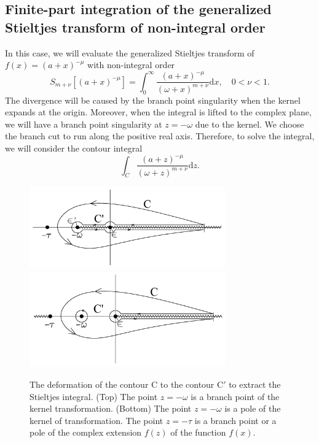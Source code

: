 \subsection{Finite-part integration of the generalized Stieltjes transform of non-integral order}
In this case, we will evaluate the generalized Stieltjes transform of $f(x) = (a+x)^{-\mu}$ with non-integral order
\begin{equation}
    S_{m+\nu}[(a+x)^{-\mu}] = \int_{0}^{\infty} \frac{(a+x)^{-\mu}}{(\omega+x)^{m+\nu}} \mathrm{d}x, \quad 0<\nu<1.
\end{equation}
The divergence will be caused by the branch point singularity when the kernel expands at the origin. Moreover, when the integral is lifted to the complex plane, we will have a branch point singularity at $z=-\omega$ due to the kernel. We choose the branch cut to run along the positive real axis. Therefore, to solve the integral, we will consider the contour integral
\begin{equation}
    \int_{C} \frac{(a+z)^{-\mu}}{(\omega+z)^{m+\nu}} \mathrm{d}z.
\end{equation}

 \begin{figure}[t]
 	\centering
 	\includegraphics[width=0.75\textwidth]{c21.PNG}
 	 	\includegraphics[width=0.75\textwidth]{c12.PNG}
 	\caption{The deformation of the contour $\mathrm{C}$ to the contour $\mathrm{C}'$ to extract the Stieltjes integral. (Top) The point $z=-\omega$ is a branch point of the kernel transformation. (Bottom) The point $z=-\omega$ is a pole of the kernel of transformation. The point $z=-\tau$ is a branch point or a pole of the complex extension $f(z)$ of the function $f(x)$.}
 	\label{deformation}
 \end{figure}

